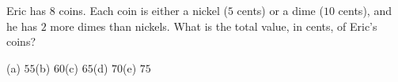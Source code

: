 Eric has $8$ coins. Each coin is either a nickel ($5$ cents) or a dime ($10$ cents), and he has $2$ more dimes than nickels. What is the total value, in cents, of Eric's coins?

(a) $55$\quad (b) $60$\quad (c) $65$\quad (d) $70$\quad (e) $75$
